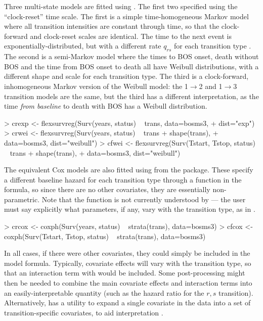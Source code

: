 \documentclass[nojss,nofooter]{jss}
\begin{document}
Three multi-state models are fitted using .  The
first two specified using the ``clock-reset'' time scale.  The first
is a simple time-homogeneous Markov model where all transition
intensities are constant through time, so that the clock-forward and
clock-reset scales are identical.  The time to the next event is
exponentially-distributed, but with a different rate $q_{rs}$ for each
transition type .  The second is a semi-Markov model where
the times to BOS onset, death without BOS and the time from BOS onset
to death all have Weibull distributions, with a different shape and
scale for each transition type.  The third is a clock-forward,
inhomogeneous Markov version of the Weibull model: the 1$\rightarrow$2
and 1$\rightarrow$3 transition models are the same, but the third has
a different interpretation, as the time \emph{from baseline} to death
with BOS has a Weibull distribution.
\begin{Schunk}
\begin{Sinput}
> crexp <- flexsurvreg(Surv(years, status) ~ trans, data=bosms3, 
+                      dist="exp")
> crwei <- flexsurvreg(Surv(years, status) ~ trans + shape(trans), 
+                      data=bosms3, dist="weibull")
> cfwei <- flexsurvreg(Surv(Tstart, Tstop, status) ~ trans + shape(trans), 
+                      data=bosms3, dist="weibull")
\end{Sinput}
\end{Schunk}
The equivalent Cox models are also fitted using
 from the  package.  These specify a
different baseline hazard for each transition type through a function
 in the formula, so since there are no other covariates,
they are essentially non-parametric.  Note that the  function
is not currently understood by  --- the user must say
explicitly what parameters, if any, vary with the transition type,
as in .
\begin{Schunk}
\begin{Sinput}
> crcox <- coxph(Surv(years, status) ~ strata(trans), data=bosms3)
> cfcox <- coxph(Surv(Tstart, Tstop, status) ~ strata(trans), data=bosms3)
\end{Sinput}
\end{Schunk}
In all cases, if there were other covariates, they could simply be
included in the model formula.  Typically, covariate effects will vary
with the transition type, so that an interaction term with
 would be included.  Some post-processing might then be
needed to combine the main covariate effects and interaction terms
into an easily-interpretable quantity (such as the hazard ratio for
the $r,s$ transition).  Alternatively,  has a utility
 to expand a single covariate in the data into a set
of transition-specific covariates, to aid interpretation
\citep[see][]{mstate:jss}.
\end{document}
